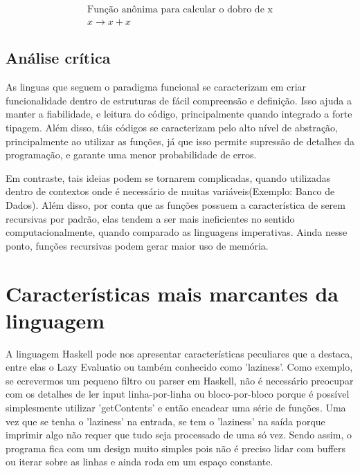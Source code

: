 \documentclass[
  12pt,				         %
  oneside,			       %
  a4paper,			       %
  english,		       	 %
  brazil,			      	 %
]{abntex2}
\begin{document}
    \begin{gather*}
      \text{Função anônima para calcular o dobro de x} \\ x \rightarrow x + x 
    \end{gather*}

    \section{Análise crítica} 

    As linguas que seguem o paradigma funcional se caracterizam em criar 
    funcionalidade dentro de estruturas de fácil compreensão e definição. Isso ajuda a manter 
    a fiabilidade, e leitura do código, principalmente quando integrado a forte tipagem. Além disso,
    táis códigos se caracterizam pelo alto nível de abstração, principalmente ao utilizar as funções,
    já que isso permite supressão de detalhes da programação, e garante uma menor probabilidade 
    de erros.

    Em contraste, tais ideias podem se tornarem complicadas, quando utilizadas dentro de contextos
    onde é necessário de muitas variáveis(Exemplo: Banco de Dados). Além disso, por conta que as funções 
    possuem a característica de serem recursivas por padrão, elas tendem a ser mais ineficientes no sentido
    computacionalmente, quando comparado as linguagens imperativas. Ainda nesse ponto, funções recursivas podem gerar maior uso de memória.


    \nocite{haskellslides}
    \nocite{funcoespura}
    \nocite{funcoespura2}
    \nocite{haskellwikipedia}
    \nocite{abntex2-wiki-como-customizar}


    \newpage

    \chapter{Características mais marcantes da linguagem}

    A linguagem Haskell pode nos apresentar características peculiares que a destaca, entre elas o Lazy Evaluatio ou também conhecido como 'laziness'. Como exemplo,
    se ecrevermos um pequeno filtro ou parser em Haskell, não é necessário preocupar com os detalhes de ler input linha-por-linha ou bloco-por-bloco porque é possível
    simplesmente utilizar 'getContents' e então encadear uma série de funções. Uma vez que se tenha o 'laziness' na entrada, se tem o 'laziness' na saída porque imprimir
    algo não requer que tudo seja processado de uma só vez. Sendo assim, o programa fica com um design muito simples pois não é preciso lidar com buffers ou iterar sobre
    as linhas e ainda roda em um espaço constante.
\end{document}
